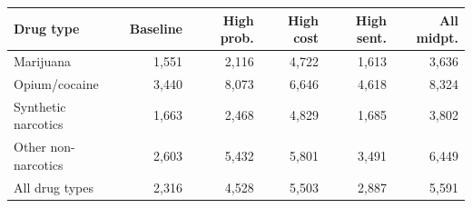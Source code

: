 \begin{tabular}{l r r r r r}
\hline
Drug type & Baseline & High prob. & High cost & High sent. & All midpt. \\
\hline
Marijuana & 1,551 & 2,116 & 4,722 & 1,613 & 3,636 \\
Opium/cocaine & 3,440 & 8,073 & 6,646 & 4,618 & 8,324 \\
Synthetic narcotics & 1,663 & 2,468 & 4,829 & 1,685 & 3,802 \\
Other non-narcotics & 2,603 & 5,432 & 5,801 & 3,491 & 6,449 \\
All drug types & 2,316 & 4,528 & 5,503 & 2,887 & 5,591 \\
\hline
\end{tabular}
